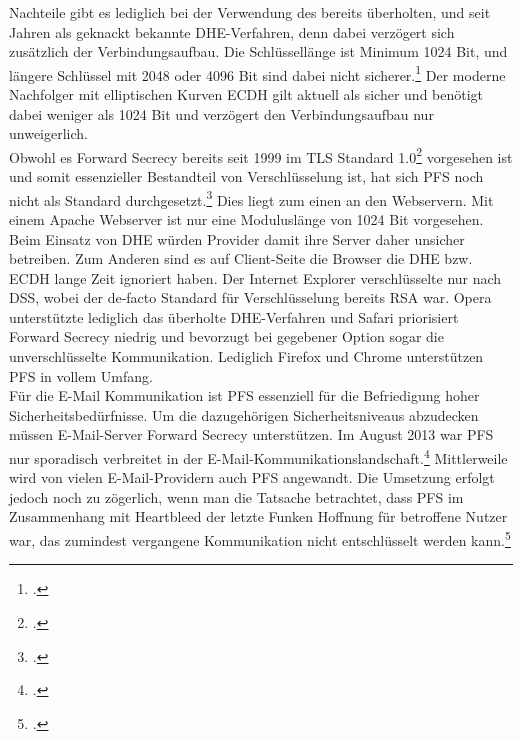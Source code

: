 \documentclass  [paper=a4,
				fontsize=12pt,
				listof=totoc,
				bibliography=totoc
				]{scrreprt}
\begin{document}
				Nachteile gibt es lediglich bei der Verwendung des bereits überholten, und seit Jahren als geknackt bekannte \ac{DHE}-Verfahren, denn dabei verzögert sich zusätzlich der Verbindungsaufbau. Die Schlüssellänge ist Minimum 1024 Bit, und längere Schlüssel mit 2048 oder 4096 Bit sind dabei nicht sicherer.\footcite[Vgl.][]{Boeck2013} Der moderne Nachfolger mit elliptischen Kurven \ac{ECDH} gilt aktuell als sicher und benötigt dabei weniger als 1024 Bit und verzögert den Verbindungsaufbau nur unweigerlich.\medskip\\
				Obwohl es Forward Secrecy bereits seit 1999 im \ac{TLS} Standard 1.0\footcite[Vgl.][]{Boeck2013} vorgesehen ist und somit essenzieller Bestandteil von Verschlüsselung ist, hat sich \ac{PFS} noch nicht als Standard durchgesetzt.\footcite{SSLLabs} Dies liegt zum einen an den Webservern. Mit einem Apache Webserver ist nur eine Moduluslänge von 1024 Bit vorgesehen. Beim Einsatz von \ac{DHE} würden Provider damit ihre Server daher unsicher betreiben. Zum Anderen sind es auf Client-Seite die Browser die \ac{DHE} bzw. \ac{ECDH} lange Zeit ignoriert haben. Der Internet Explorer verschlüsselte nur nach DSS, wobei der de-facto Standard für Verschlüsselung bereits \ac{RSA} war. Opera unterstützte lediglich das überholte \ac{DHE}-Verfahren und Safari priorisiert Forward Secrecy niedrig und bevorzugt bei gegebener Option sogar die unverschlüsselte Kommunikation. Lediglich Firefox und Chrome unterstützen \ac{PFS} in vollem Umfang.\medskip\\
				Für die E-Mail Kommunikation ist \ac{PFS} essenziell für die Befriedigung hoher Sicherheitsbedürfnisse. Um die dazugehörigen Sicherheitsniveaus abzudecken müssen E-Mail-Server Forward Secrecy unterstützen. Im August 2013 war \ac{PFS} nur sporadisch verbreitet in der E-Mail-Kommunikationslandschaft.\footcite[Vgl. ][]{Schulz2014} Mittlerweile wird von vielen E-Mail-Providern auch \ac{PFS} angewandt. Die Umsetzung erfolgt jedoch noch zu zögerlich, wenn man die Tatsache betrachtet, dass \ac{PFS} im Zusammenhang mit Heartbleed der letzte Funken Hoffnung für betroffene Nutzer war, das zumindest vergangene Kommunikation nicht entschlüsselt werden kann.\footcite[Vgl.][]{Zhu2014}
		
\end{document}
